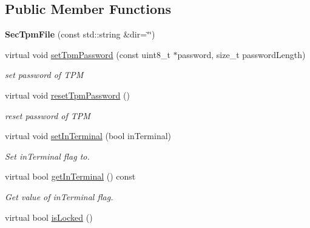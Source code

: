 \subsection*{Public Member Functions}
\begin{DoxyCompactItemize}
\item 
{\bfseries Sec\+Tpm\+File} (const std\+::string \&dir=\char`\"{}\char`\"{})\hypertarget{classndn_1_1SecTpmFile_a02a1dec01a23730c608a15e94be23f53}{}\label{classndn_1_1SecTpmFile_a02a1dec01a23730c608a15e94be23f53}

\item 
virtual void \hyperlink{classndn_1_1SecTpmFile_a8130c6fd772f9df7c217f2e23a75b0ac}{set\+Tpm\+Password} (const uint8\+\_\+t $\ast$password, size\+\_\+t password\+Length)
\begin{DoxyCompactList}\small\item\em set password of T\+PM \end{DoxyCompactList}\item 
virtual void \hyperlink{classndn_1_1SecTpmFile_a469d08b7da57d5c57b957654a183c425}{reset\+Tpm\+Password} ()\hypertarget{classndn_1_1SecTpmFile_a469d08b7da57d5c57b957654a183c425}{}\label{classndn_1_1SecTpmFile_a469d08b7da57d5c57b957654a183c425}

\begin{DoxyCompactList}\small\item\em reset password of T\+PM \end{DoxyCompactList}\item 
virtual void \hyperlink{classndn_1_1SecTpmFile_a4a5a4e0967caa1deabfb2c23f737ecb0}{set\+In\+Terminal} (bool in\+Terminal)
\begin{DoxyCompactList}\small\item\em Set in\+Terminal flag to. \end{DoxyCompactList}\item 
virtual bool \hyperlink{classndn_1_1SecTpmFile_a78f4e71bfc296ff5087aa651c74540f4}{get\+In\+Terminal} () const\hypertarget{classndn_1_1SecTpmFile_a78f4e71bfc296ff5087aa651c74540f4}{}\label{classndn_1_1SecTpmFile_a78f4e71bfc296ff5087aa651c74540f4}

\begin{DoxyCompactList}\small\item\em Get value of in\+Terminal flag. \end{DoxyCompactList}\item 
virtual bool \hyperlink{classndn_1_1SecTpmFile_a0bb5839df1c2586fdc23e97cd73900aa}{is\+Locked} ()\hypertarget{classndn_1_1SecTpmFile_a0bb5839df1c2586fdc23e97cd73900aa}{}\label{classndn_1_1SecTpmFile_a0bb5839df1c2586fdc23e97cd73900aa}


\end{DoxyCompactItemize}

